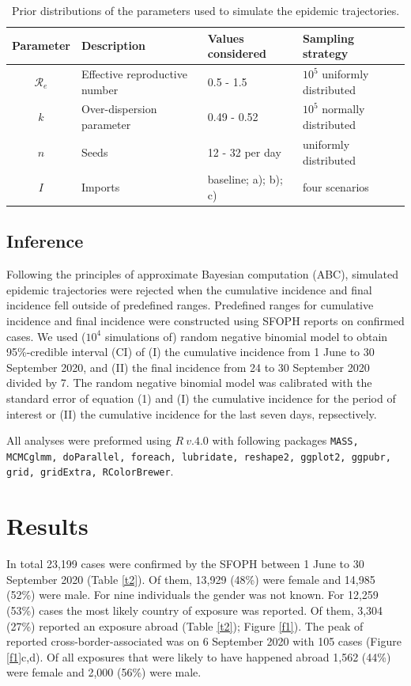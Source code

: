 \documentclass[10pt, a4paper, twoside]{article}
\begin{document}
\begin{table}
\centering
\begingroup\footnotesize
\begin{tabular}{clll}
	\hline
	Parameter & Description & Values considered & Sampling strategy\\
	\hline
	$\mathcal{R}_e$ & Effective reproductive number & 0.5 - 1.5 & $10^5$ uniformly distributed\\
	$k$ & Over-dispersion parameter & 0.49 - 0.52 & $10^5$ normally distributed\\
	$n$ & Seeds & 12 - 32 per day & uniformly distributed\\
	$I$ & Imports & baseline; a); b); c) & four scenarios\\
	\hline
\end{tabular}
\endgroup
\caption{Prior distributions of the parameters used to simulate the epidemic trajectories.} 
\label{t1}
\end{table}
\begin{multicols}{2}

\subsection{Inference}
Following the principles of approximate Bayesian computation (ABC), simulated epidemic trajectories were rejected when the cumulative incidence and final incidence fell outside of predefined ranges.
Predefined ranges for cumulative incidence and final incidence were constructed using SFOPH reports on confirmed cases.
We used ($10^4$ simulations of) random negative binomial model to obtain 95\%-credible interval (CI) of (I) the cumulative incidence from 1 June to 30 September 2020, and (II) the final incidence from 24 to 30 September 2020 divided by 7.
The random negative binomial model was calibrated with the standard error of equation (1) and (I) the cumulative incidence for the period of interest or (II) the cumulative incidence for the last seven days, repsectively.

All analyses were preformed using $R~v.4.0$ with following packages \texttt{MASS, MCMCglmm, doParallel, foreach, lubridate, reshape2, ggplot2, ggpubr, grid, gridExtra, RColorBrewer}.\cite{r_core_team_r_2020}%

\section{Results}
In total 23,199 cases were confirmed by the SFOPH between 1 June to 30 September 2020 (Table \ref{t2}). 
Of them, 13,929 (48\%) were female and 14,985 (52\%) were male.
For nine individuals the gender was not known.
For 12,259 (53\%) cases the most likely country of exposure was reported.
Of them, 3,304 (27\%) reported an exposure abroad (Table \ref{t2}); Figure \ref{f1}).
The peak of reported cross-border-associated was on 6 September 2020 with 105 cases (Figure \ref{f1}c,d).
Of all exposures that were likely to have happened abroad 1,562 (44\%) were female and 2,000 (56\%) were male.

\end{multicols}
\end{document}
